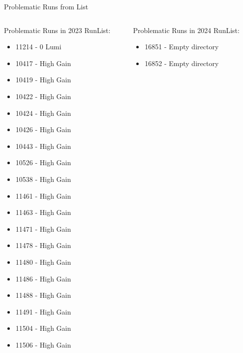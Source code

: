 \begin{frame}{Problematic Runs from List}
    \begin{columns}
        \begin{column}{0.5 \linewidth}
            \small Problematic Runs in 2023 RunList:
            \begin{itemize}
                \scriptsize
                \item 11214 - 0 Lumi
                \item 10417 - High Gain
                \item 10419 - High Gain
                \item 10422 - High Gain
                \item 10424 - High Gain
                \item 10426 - High Gain
                \item 10443 - High Gain
                \item 10526 - High Gain
                \item 10538 - High Gain
                \item 11461 - High Gain
                \item 11463 - High Gain
                \item 11471 - High Gain
                \item 11478 - High Gain
                \item 11480 - High Gain
                \item 11486 - High Gain
                \item 11488 - High Gain
                \item 11491 - High Gain
                \item 11504 - High Gain
                \item 11506 - High Gain
            \end{itemize}
        \end{column}
        \begin{column}{0.5\linewidth}
            \small Problematic Runs in 2024 RunList:
            \begin{itemize}
                \scriptsize
                \item 16851 - Empty directory
                \item 16852 - Empty directory
            \end{itemize}
        \end{column}
    \end{columns}

    
\end{frame}
